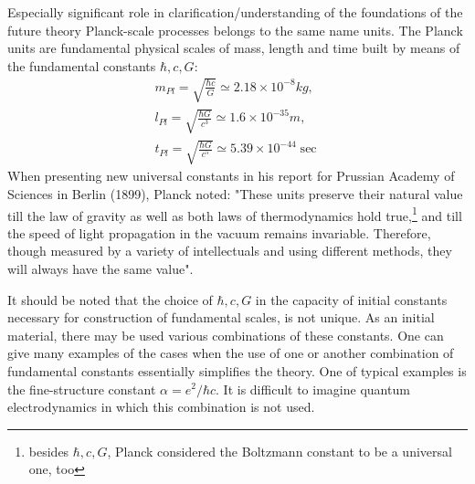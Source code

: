 \documentclass [12pt]{article}
\begin{document}
Especially significant role in clarification/understanding of the foundations of the future theory Planck-scale processes belongs to the same name units. The Planck units are fundamental physical scales of mass, length and time built by means of the fundamental constants $\hbar ,c,G$:
	\[\begin{array}{l}
{m_{Pl}} = \sqrt {\frac{{\hbar c}}{G}}  \simeq 2.18 \times {10^{ - 8}}kg,\\
{l_{Pl}} = \sqrt {\frac{{\hbar G}}{{{c^3}}}}  \simeq 1.6 \times {10^{ - 35}}m,\\
{t_{Pl}} = \sqrt {\frac{{\hbar G}}{{{c^5}}}}  \simeq 5.39 \times {10^{ - 44}}\sec
\end{array}\]
When presenting new universal constants in his report for Prussian Academy of Sciences in Berlin  (1899), Planck noted: "These units preserve their natural value till the law of gravity as well as both laws of thermodynamics hold true,\footnote{besides  $\hbar ,c,G$, Planck considered  the Boltzmann constant to be a universal one, too} and till the speed of light propagation  in the vacuum  remains invariable. Therefore, though measured by a variety of intellectuals  and using  different methods, they will always have the same value".

It should be noted that the choice of  $\hbar ,c,G$ in the capacity of initial constants necessary for construction of  fundamental scales, is not unique. As an initial material, there may be used various combinations of these constants. One can give many examples of the cases when the use of one or another combination of fundamental constants essentially simplifies the  theory. One of typical examples is  the fine-structure constant  $\alpha  = {e^2}/\hbar c$. It is difficult to imagine quantum  electrodynamics in which this combination is not used.
\end{document}

